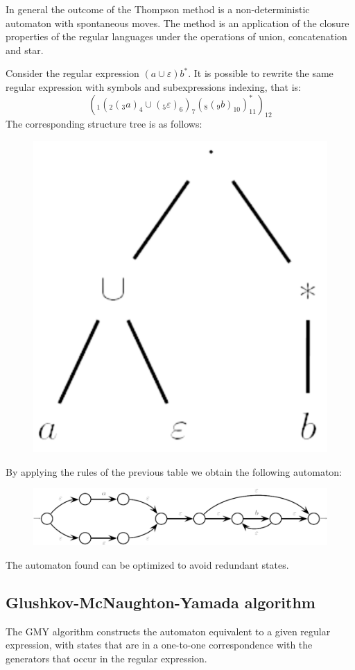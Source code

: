 In general the outcome of the Thompson method is a non-deterministic automaton with spontaneous moves. 
The method is an application of the closure properties of the regular languages under the operations of union, concatenation and star.
\begin{example}
    Consider the regular expression $(a \cup \varepsilon)b^{*}$. 
    It is possible to rewrite the same regular expression with symbols and subexpressions indexing, that is: 
    \[\left(_1\left(_2\left(_3a\right)_4 \cup \left(_5\varepsilon\right)_6\right)_7\left(_8\left(_9b\right)_{10}\right)_{11}^{*}\right)_{12}\]
    The corresponding structure tree is as follows: 
    \begin{figure}[H]
        \centering
        \includegraphics[width=0.15\linewidth]{images/st.png}
    \end{figure}
    By applying the rules of the previous table we obtain the following automaton: 
    \begin{figure}[H]
        \centering
        \includegraphics[width=0.75\linewidth]{images/at.png}
    \end{figure}
    The automaton found can be optimized to avoid redundant states. 
\end{example}







\subsection*{Glushkov-McNaughton-Yamada algorithm}
The GMY algorithm constructs the automaton equivalent to a given regular expression, with states that are in a one-to-one correspondence with the generators that occur in the regular expression. 

